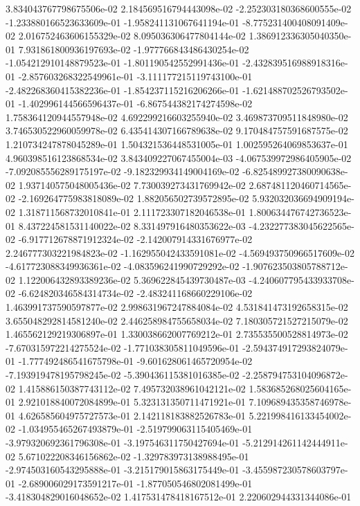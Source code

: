 3.834043767798675506e-02
2.184569516794443098e-02
-2.252303180368600555e-02
-1.233880166523633609e-01
-1.958241131067641194e-01
-8.775231400408091409e-02
2.016752463606155329e-02
8.095036306477804144e-02
1.386912336305040350e-01
7.931861800936197693e-02
-1.977766843486430254e-02
-1.054212910148879523e-01
-1.801190542552991436e-01
-2.432839516988918316e-01
-2.857603268322549961e-01
-3.111177215119743100e-01
-2.482268360415382236e-01
-1.854237115216206266e-01
-1.621488702526793502e-01
-1.402996144566596437e-01
-6.867544382174274598e-02
1.758364120944557948e-02
4.692299216603255940e-02
3.469873709511848980e-02
3.746530522960059978e-02
6.435414307166789638e-02
9.170484757591687575e-02
1.210734247878045289e-01
1.504321536448531005e-01
1.002595264069853637e-01
4.960398516123868534e-02
3.843409227067455004e-03
-4.067539972986405905e-02
-7.092085556289175197e-02
-9.182329934149004169e-02
-6.825489927380090638e-02
1.937140575048005436e-02
7.730039273431769942e-02
2.687481120460714565e-02
-2.169264775983818089e-02
1.882056502739572895e-02
5.932032036694909194e-02
1.318711568732010841e-01
2.111723307182046538e-01
1.800634476742736523e-01
8.437224581531140022e-02
8.331497916480353622e-03
-4.232277383045622565e-02
-6.917712678871912324e-02
-2.142007914331676977e-02
2.246777303221984823e-02
-1.162955042433591081e-02
-4.569493750966517609e-02
-4.617723088349936361e-02
-4.083596241990729292e-02
-1.907623503805788712e-02
1.122006432893389236e-02
5.369622845439730487e-03
-4.240607795433933708e-02
-6.624820346584314734e-02
-2.483241168660229106e-02
1.463991737590597877e-02
2.998631967247884084e-02
4.531841473192658315e-02
3.655048292814581240e-02
2.446258984755658034e-02
7.180305721527215079e-02
1.465562129219306897e-01
1.330038662007769212e-01
2.735535500528814973e-02
-7.670315972214275524e-02
-1.771038305811049596e-01
-2.594374917293824079e-01
-1.777492486541675798e-01
-9.601628061465720954e-02
-7.193919478195798245e-02
-5.390436115381016385e-02
-2.258794753104096872e-02
1.415886150387743112e-02
7.495732038961042121e-02
1.583685268025604165e-01
2.921018840072084899e-01
5.323131350711471921e-01
7.109689435358746978e-01
4.626585604975727573e-01
2.142118183882526783e-01
5.221998416133454002e-02
-1.034955465267493879e-01
-2.519799063115405469e-01
-3.979320692361796308e-01
-3.197546311750427694e-01
-5.212914261142444911e-02
5.671022208346156862e-02
-1.329783973138988495e-01
-2.974503160543295888e-01
-3.215179015863175449e-01
-3.455987230578603797e-01
-2.689006029173591217e-01
-1.877050546802081499e-01
-3.418304829016048652e-02
1.417531478418167512e-01
2.220602944331344086e-01
